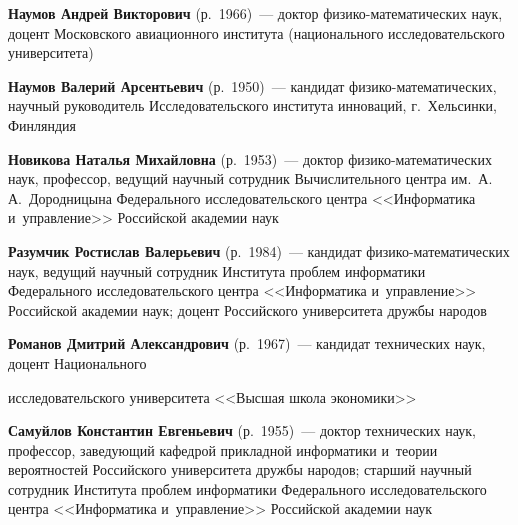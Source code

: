 \begin{multicols}{2}
 \vspace*{3pt}

\noindent
\textbf{Наумов Андрей Викторович} (р.\ 1966)~--- доктор 
фи\-зи\-ко-ма\-те\-ма\-ти\-че\-ских наук, доцент Московского авиационного института 
(национального исследовательского университета)

\vspace*{3pt}

\noindent
\textbf{Наумов Валерий Арсентьевич} (р.\ 1950)~--- кандидат 
фи\-зи\-ко-ма\-те\-ма\-ти\-че\-ских, научный руководитель Исследовательского 
института инноваций, г.~Хельсинки,  Финляндия

\vspace*{3pt}

\noindent
\textbf{Новикова Наталья Михайловна} (р.\ 1953)~--- 
доктор фи\-зи\-ко-ма\-те\-ма\-ти\-че\-ских
 наук, профессор, ведущий научный со\-труд\-ник Вычислительного центра им.\ 
 А.\,А.~Дородницына Федерального исследовательского цент\-ра 
 <<Информатика и~управ\-ле\-ние>> Российской академии наук
 
 \vspace*{3pt}

\noindent
\textbf{Разумчик Ростислав Валерьевич} (р.\ 1984)~--- 
кандидат фи\-зи\-ко-ма\-те\-ма\-ти\-че\-ских наук, ведущий научный 
со\-труд\-ник Института проб\-лем информатики Федерального исследовательского цент\-ра 
<<Информатика и~управ\-ле\-ние>> Российской академии наук; доцент Российского 
университета дружбы народов

\vspace*{3pt}

\noindent
\textbf{Романов Дмитрий Александрович} (р.\ 1967)~--- 
кандидат технических наук, доцент 
Национального\linebreak\vspace*{-12pt}

\columnbreak

\noindent
 исследовательского университета <<Высшая школа экономики>>


\vspace*{3pt}
 
 \noindent
\textbf{Самуйлов Константин Евгеньевич} (р.\ 1955)~--- доктор технических наук, 
профессор, за\-ве\-ду\-ющий кафед\-рой прикладной информатики и~тео\-рии 
вероятно\-стей Российского университета друж\-бы народов; 
старший научный со\-труд\-ник Института проб\-лем информатики Федерального 
исследовательского цент\-ра <<Информатика и~управ\-ле\-ние>> 
Российской академии наук


\end{multicols}
